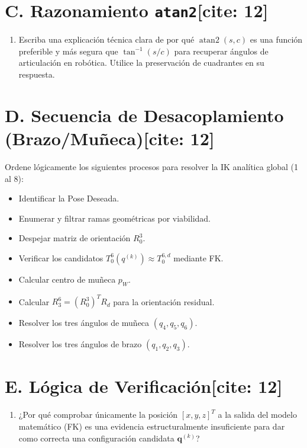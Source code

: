 \documentclass[11pt, a4paper]{article}
\begin{document}
\section*{C. Razonamiento \texttt{atan2}[cite: 12]}
\begin{enumerate}
    \item Escriba una explicación técnica clara de por qué $\operatorname{atan2}(s,c)$ es una función preferible y más segura que $\tan^{-1}(s/c)$ para recuperar ángulos de articulación en robótica. Utilice la preservación de cuadrantes en su respuesta.
\end{enumerate}
\vspace{3cm}

\section*{D. Secuencia de Desacoplamiento (Brazo/Muñeca)[cite: 12]}
Ordene lógicamente los siguientes procesos para resolver la IK analítica global (1 al 8):
\begin{itemize}
    \item[\rule{1cm}{0.15mm}] Identificar la Pose Deseada.
    \item[\rule{1cm}{0.15mm}] Enumerar y filtrar ramas geométricas por viabilidad.
    \item[\rule{1cm}{0.15mm}] Despejar matriz de orientación $R_0^3$.
    \item[\rule{1cm}{0.15mm}] Verificar los candidatos $T_0^6(q^{(k)}) \approx T_0^{6,d}$ mediante FK.
    \item[\rule{1cm}{0.15mm}] Calcular centro de muñeca $p_W$.
    \item[\rule{1cm}{0.15mm}] Calcular $R_3^6 = (R_0^3)^T R_d$ para la orientación residual.
    \item[\rule{1cm}{0.15mm}] Resolver los tres ángulos de muñeca $(q_4, q_5, q_6)$.
    \item[\rule{1cm}{0.15mm}] Resolver los tres ángulos de brazo $(q_1, q_2, q_3)$.
\end{itemize}

\section*{E. Lógica de Verificación[cite: 12]}
\begin{enumerate}
    \item ¿Por qué comprobar únicamente la posición $[x, y, z]^T$ a la salida del modelo matemático (FK) es una evidencia estructuralmente insuficiente para dar como correcta una configuración candidata $\mathbf{q}^{(k)}$?
\end{enumerate}
\end{document}
